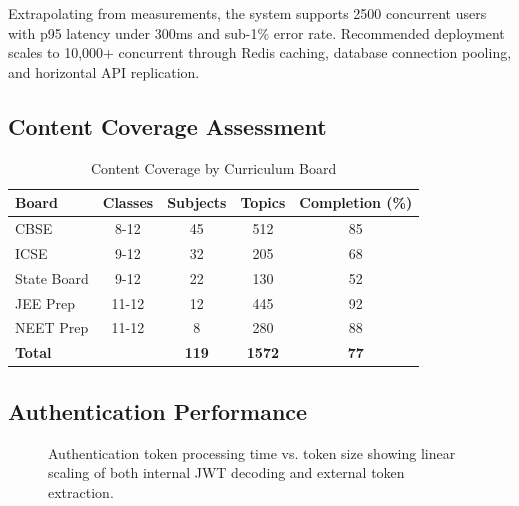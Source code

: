\documentclass[10pt,conference,compsocconf]{IEEEtran}
\begin{document}
Extrapolating from measurements, the system supports 2500 concurrent users with p95 latency under 300ms and sub-1\% error rate. Recommended deployment scales to 10,000+ concurrent through Redis caching, database connection pooling, and horizontal API replication.

\subsection{Content Coverage Assessment}

\begin{table}[h]
\centering
\caption{Content Coverage by Curriculum Board}
\label{tab:content_coverage}
\small
\begin{tabular}{|l|c|c|c|c|}
\hline
\textbf{Board} & \textbf{Classes} & \textbf{Subjects} & \textbf{Topics} & \textbf{Completion (\%)} \\
\hline
CBSE & 8-12 & 45 & 512 & 85 \\
ICSE & 9-12 & 32 & 205 & 68 \\
State Board & 9-12 & 22 & 130 & 52 \\
JEE Prep & 11-12 & 12 & 445 & 92 \\
NEET Prep & 11-12 & 8 & 280 & 88 \\
\hline
\textbf{Total} & & \textbf{119} & \textbf{1572} & \textbf{77} \\
\hline
\end{tabular}
\end{table}

\subsection{Authentication Performance}

\begin{figure}[h]
\centering
{}
\caption{Authentication token processing time vs. token size showing linear scaling of both internal JWT decoding and external token extraction.}
\label{fig:auth_perf}
\end{figure}
\end{document}
